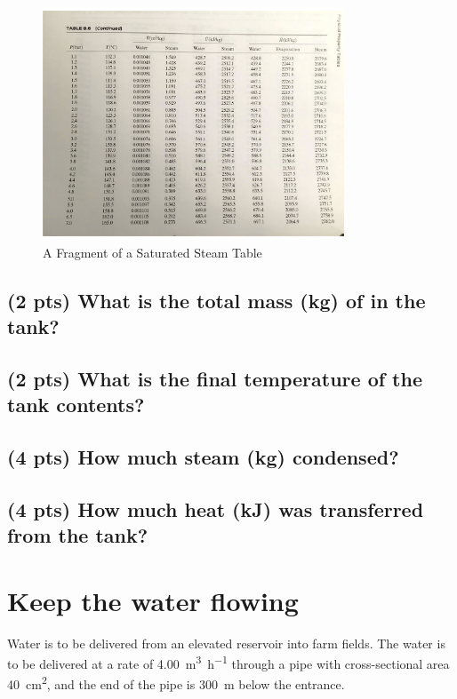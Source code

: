 \documentclass[11pt]{article}
\begin{document}
\begin{figure}[htb]
\centering
\includegraphics[width=0.8\textwidth]{./Quiz3.png}
\caption{A Fragment of a Saturated Steam Table}
\end{figure}

\subsection{(2 pts) What is the total mass (kg) of  in the tank?}
\label{sec-1-1}
\newpage
\subsection{(2 pts) What is the final temperature of the tank contents?}
\label{sec-1-2}
\vspace{4cm}
\subsection{(4 pts) How much steam (kg) condensed?}
\label{sec-1-3}
\vspace{9cm}
\subsection{(4 pts) How much heat (kJ) was transferred from the tank?}
\label{sec-1-4}
\newpage


\section{Keep the water flowing}
\label{sec-2}
Water is to be delivered from an elevated reservoir into farm fields.  The water is to be delivered at a rate of \SI{4.00}{\meter\cubed\per\hour} through a pipe with cross-sectional area \SI{40}{\centi\meter\squared}, and the end of the pipe is \SI{300}{\meter} below the entrance.
\\
\end{document}
